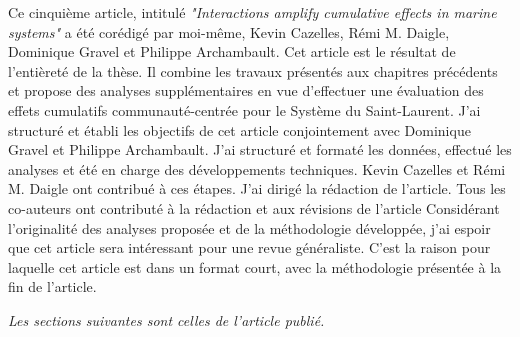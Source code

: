 Ce cinquième article, intitulé \textit{"Interactions amplify cumulative effects in marine systems"} a été corédigé par moi-même, Kevin Cazelles, Rémi M. Daigle, Dominique Gravel et Philippe Archambault. Cet article est le résultat de l'entièreté de la thèse. Il combine les travaux présentés aux chapitres précédents et propose des analyses supplémentaires en vue d'effectuer une évaluation des effets cumulatifs communauté-centrée pour le Système du Saint-Laurent. J'ai structuré et établi les objectifs de cet article conjointement avec Dominique Gravel et Philippe Archambault. J'ai structuré et formaté les données, effectué les analyses et été en charge des développements techniques. Kevin Cazelles et Rémi M. Daigle ont contribué à ces étapes. J'ai dirigé la rédaction de l'article. Tous les co-auteurs ont contributé à la rédaction et aux révisions de l'article Considérant l'originalité des analyses proposée et de la méthodologie développée, j'ai espoir que cet article sera intéressant pour une revue généraliste. C'est la raison pour laquelle cet article est dans un format court, avec la méthodologie présentée à la fin de l'article. \linebreak[4]


\textit{Les sections suivantes sont celles de l'article publié.}
